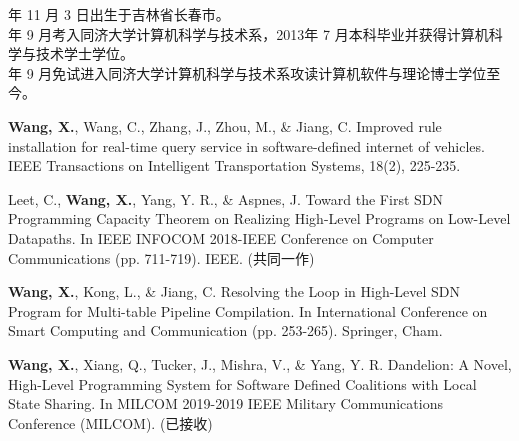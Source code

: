  年 11 月 3 日出生于吉林省长春市。\\
 年 9 月考入同济大学计算机科学与技术系，2013年 7 月本科毕业并获得计算机科学与技术学士学位。\\
 年 9 月免试进入同济大学计算机科学与技术系攻读计算机软件与理论博士学位至今。

\begin{enumerate}[{[}1{]}]
\item \textbf{Wang, X.}, Wang, C., Zhang, J., Zhou, M., \& Jiang, C. Improved rule installation for real-time query service in software-defined internet of vehicles. IEEE Transactions on Intelligent Transportation Systems, 18(2), 225-235.
\item Leet, C., \textbf{Wang, X.}, Yang, Y. R., \& Aspnes, J. Toward the First SDN Programming Capacity Theorem on Realizing High-Level Programs on Low-Level Datapaths. In IEEE INFOCOM 2018-IEEE Conference on Computer Communications (pp. 711-719). IEEE. (共同一作)
\item \textbf{Wang, X.}, Kong, L., \& Jiang, C. Resolving the Loop in High-Level SDN Program for Multi-table Pipeline Compilation. In International Conference on Smart Computing and Communication (pp. 253-265). Springer, Cham.
\item \textbf{Wang, X.}, Xiang, Q., Tucker, J., Mishra, V., \& Yang, Y. R. Dandelion: A Novel, High-Level Programming System for Software Defined Coalitions with Local State Sharing. In MILCOM 2019-2019 IEEE Military Communications Conference (MILCOM). (已接收)
\end{enumerate}

